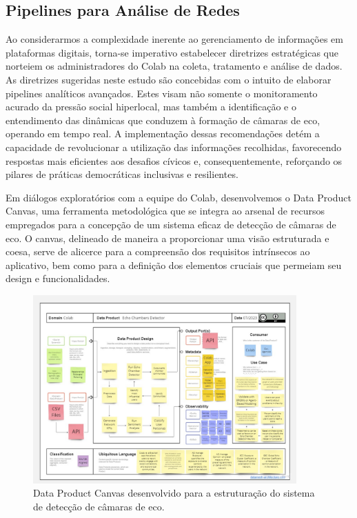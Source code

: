 \subsection*{Pipelines para Análise de Redes}

Ao considerarmos a complexidade inerente ao gerenciamento de informações em plataformas digitais, torna-se imperativo estabelecer diretrizes estratégicas que norteiem os administradores do Colab na coleta, tratamento e análise de dados. As diretrizes sugeridas neste estudo são concebidas com o intuito de elaborar pipelines analíticos avançados. Estes visam não somente o monitoramento acurado da pressão social hiperlocal, mas também a identificação e o entendimento das dinâmicas que conduzem à formação de câmaras de eco, operando em tempo real. A implementação dessas recomendações detém a capacidade de revolucionar a utilização das informações recolhidas, favorecendo respostas mais eficientes aos desafios cívicos e, consequentemente, reforçando os pilares de práticas democráticas inclusivas e resilientes.

Em diálogos exploratórios com a equipe do Colab, desenvolvemos o Data Product Canvas, uma ferramenta metodológica que se integra ao arsenal de recursos empregados para a concepção de um sistema eficaz de detecção de câmaras de eco. O canvas, delineado de maneira a proporcionar uma visão estruturada e coesa, serve de alicerce para a compreensão dos requisitos intrínsecos ao aplicativo, bem como para a definição dos elementos cruciais que permeiam seu design e funcionalidades.

\begin{figure}[H]
	\centering
	\includegraphics[width=0.9\textwidth]{tex/includes/data_canvas.pdf}
	\caption{Data Product Canvas desenvolvido para a estruturação do sistema de detecção de câmaras de eco.}
	\label{fig:data_canvas}
\end{figure}


